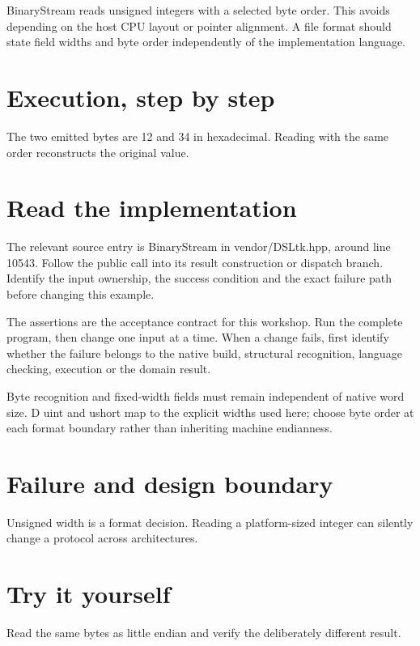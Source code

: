 \clearpage
{}
BinaryStream reads unsigned integers with a selected byte order. This avoids depending on the host CPU layout or pointer alignment. A file format should state field widths and byte order independently of the implementation language.


\section*{Execution, step by step}
The two emitted bytes are 12 and 34 in hexadecimal. Reading with the same order reconstructs the original value.

\section*{Read the implementation}
The relevant source entry is BinaryStream in vendor/DSLtk.hpp, around line 10543. Follow the public call into its result construction or dispatch branch. Identify the input ownership, the success condition and the exact failure path before changing this example.

The assertions are the acceptance contract for this workshop. Run the complete program, then change one input at a time. When a change fails, first identify whether the failure belongs to the native build, structural recognition, language checking, execution or the domain result.

\clearpage
{}
Byte recognition and fixed-width fields must remain independent of native word size. D uint and ushort map to the explicit widths used here; choose byte order at each format boundary rather than inheriting machine endianness.


\section*{Failure and design boundary}
Unsigned width is a format decision. Reading a platform-sized integer can silently change a protocol across architectures.

\section*{Try it yourself}
Read the same bytes as little endian and verify the deliberately different result.

